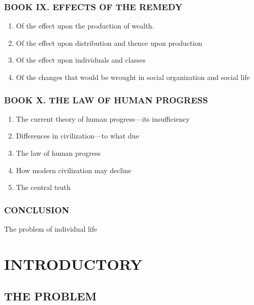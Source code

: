 \hypertarget{book-ix.-effects-of-the-remedy}{%
\subsubsection{BOOK IX. EFFECTS OF THE
REMEDY}\label{book-ix.-effects-of-the-remedy}}

\begin{enumerate}
\def\labelenumi{\arabic{enumi}.}
\tightlist
\item
  Of the effect upon the production of wealth.
\item
  Of the effect upon distribution and thence upon production
\item
  Of the effect upon individuals and classes
\item
  Of the changes that would be wrought in social organization and social
  life
\end{enumerate}

\hypertarget{book-x.-the-law-of-human-progress}{%
\subsubsection{BOOK X. THE LAW OF HUMAN
PROGRESS}\label{book-x.-the-law-of-human-progress}}

\begin{enumerate}
\def\labelenumi{\arabic{enumi}.}
\tightlist
\item
  The current theory of human progress---its insufficiency
\item
  Differences in civilization---to what due
\item
  The law of human progress
\item
  How modern civilization may decline
\item
  The central truth
\end{enumerate}

\hypertarget{conclusion}{%
\subsubsection{CONCLUSION}\label{conclusion}}

The problem of individual life

\newpage

\hypertarget{Introductory}{%
\section{INTRODUCTORY}\label{Introductory}}

\hypertarget{the-problem}{%
\subsection{THE PROBLEM}\label{the-problem}}


